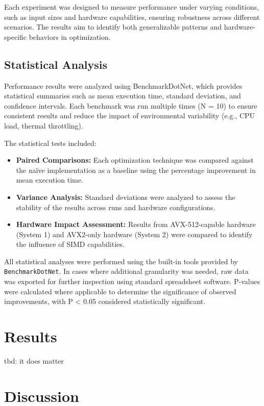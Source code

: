 \documentclass{article}
\begin{document}
Each experiment was designed to measure performance under varying conditions, such as input sizes and hardware capabilities, ensuring robustness across different scenarios. The results aim to identify both generalizable patterns and hardware-specific behaviors in optimization.

\subsection{Statistical Analysis}

Performance results were analyzed using BenchmarkDotNet, which provides statistical summaries such as mean execution time, standard deviation, and confidence intervals. Each benchmark was run multiple times (N = 10) to ensure consistent results and reduce the impact of environmental variability (e.g., CPU load, thermal throttling).

The statistical tests included:
\begin{itemize}
    \item \textbf{Paired Comparisons:} Each optimization technique was compared against the naïve implementation as a baseline using the percentage improvement in mean execution time.
    \item \textbf{Variance Analysis:} Standard deviations were analyzed to assess the stability of the results across runs and hardware configurations.
    \item \textbf{Hardware Impact Assessment:} Results from AVX-512-capable hardware (System 1) and AVX2-only hardware (System 2) were compared to identify the influence of SIMD capabilities.
\end{itemize}

All statistical analyses were performed using the built-in tools provided by \texttt{BenchmarkDotNet}. In cases where additional granularity was needed, raw data was exported for further inspection using standard spreadsheet software. P-values were calculated where applicable to determine the significance of observed improvements, with P < 0.05 considered statistically significant.

\section{Results}
tbd: it does matter

\section{Discussion}
\end{document}
